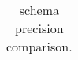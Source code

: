 \begin{table}
{\begin{tabular}{lc@{\hs}rrc@{\s}rrc@{\s}rrc@{\s}rrc@{\s}rrc@{\s}rr}
\bottomrule
\end{tabular}
}
\caption{\gls{schema} precision comparison.}
\label{tab:precision-schema}
\end{table}
